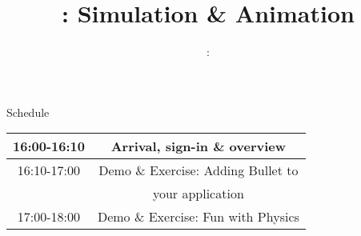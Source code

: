 \usepackage{../../beamerthemeFalmouthGamesAcademy}
\usepackage{multimedia}
\graphicspath{ {../../} }




\usepackage[normalem]{ulem}
\usepackage{wasysym}

\usepackage{pdfpages}

\usepackage{caption}
\captionsetup[figure]{font=scriptsize,labelfont=scriptsize}

\usetikzlibrary{arrows,automata}




\title{\sessionnumber: Simulation \& Animation}
\subtitle{\modulecode: \moduletitle}

\frame{\titlepage} 





\begin{frame}{Schedule}
	\begin{center}
		\begin{tabular}{|c c|}
			\hline
			16:00-16:10 & Arrival, sign-in \& overview \\
			\hline
			16:10-17:00 & Demo \& Exercise: Adding Bullet to\\&your application \\
			17:00-18:00 & Demo \& Exercise: Fun with Physics \\
			\hline
		\end{tabular}
	\end{center}
\end{frame}




